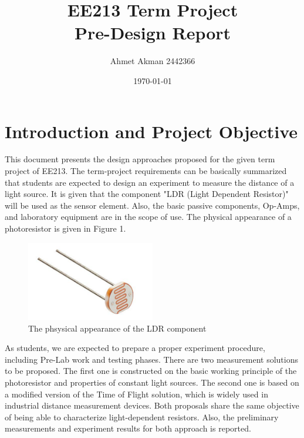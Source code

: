 \documentclass[letterpaper,12pt]{article}
\begin{document}
\title{EE213 Term Project \protect\\Pre-Design Report}
\author{Ahmet Akman 2442366}
\date{\today}
\maketitle
\newpage

\tableofcontents
\newpage


\section{Introduction and Project Objective}
This document presents the design approaches proposed for the given term project of EE213. The term-project requirements can be basically summarized that students are expected to design an experiment to measure the distance of a light source. It is given that the component "LDR (Light Dependent Resistor)" will be used as the sensor element. Also, the basic passive components, Op-Amps, and laboratory equipment are in the scope of use. The physical appearance of a photoresistor is given in Figure 1. 
\begin{figure}[H]
	\centering
   \includegraphics[width=0.5\textwidth]{LDR_photo.png}
   \caption{The phsysical appearance of the LDR component}
\end{figure} 
As students, we are expected to prepare a proper experiment procedure, including Pre-Lab work and testing phases. 
There are two measurement solutions to be proposed. The first one is constructed on the basic working principle of the photoresistor and properties of constant light sources. The second one is based on a modified version of the Time of Flight solution, which is widely used in industrial distance measurement devices. Both proposals share the same objective of being able to characterize light-dependent resistors. Also, the preliminary measurements and experiment results for both approach is reported.
\end{document}
